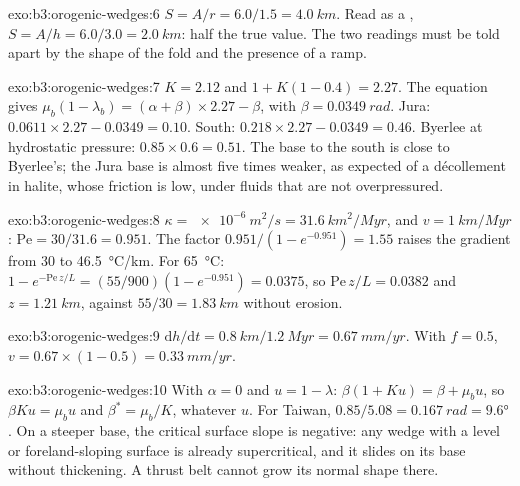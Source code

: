 \begin{solution}{exo:b3:orogenic-wedges:6}
$S = A/r = 6.0/1.5 = \qty{4.0}{km}$. Read as a , $S = A/h =
6.0/3.0 = \qty{2.0}{km}$: half the true value. The two readings must be told
apart by the shape of the fold and the presence of a ramp.
\end{solution}

\begin{solution}{exo:b3:orogenic-wedges:7}
$K = 2.12$ and $1 + K(1 - 0.4) = 2.27$. The equation gives $\mu_b(1 -
\lambda_b) = (\alpha + \beta)\times2.27 - \beta$, with $\beta =
\qty{0.0349}{rad}$. Jura: $0.0611\times2.27 - 0.0349 = 0.10$. South:
$0.218\times2.27 - 0.0349 = 0.46$. Byerlee at hydrostatic pressure:
$0.85\times0.6 = 0.51$. The base to the south is close to Byerlee's; the
Jura base is almost five times weaker, as expected of a décollement in
halite, whose friction is low, under fluids that are not overpressured.
\end{solution}

\begin{solution}{exo:b3:orogenic-wedges:8}
$\kappa = \qty{e-6}{m^2/s} = \qty{31.6}{km^2/Myr}$, and $v =
\qty{1}{km/Myr}$: $\mathrm{Pe} = 30/31.6 = 0.951$. The factor $0.951/(1 -
e^{-0.951}) = 1.55$ raises the gradient from 30 to \qty{46.5}{\celsius/km}.
For \qty{65}{\celsius}: $1 - e^{-\mathrm{Pe}\,z/L} = (55/900)(1 - e^{-0.951})
= 0.0375$, so $\mathrm{Pe}\,z/L = 0.0382$ and $z = \qty{1.21}{km}$, against
$55/30 = \qty{1.83}{km}$ without erosion.
\end{solution}

\begin{solution}{exo:b3:orogenic-wedges:9}
$\mathrm dh/\mathrm dt = \qty{0.8}{km}/\qty{1.2}{Myr} = \qty{0.67}{mm/yr}$.
With $f = 0.5$, $v = 0.67\times(1 - 0.5) = \qty{0.33}{mm/yr}$.
\end{solution}

\begin{solution}{exo:b3:orogenic-wedges:10}
With $\alpha = 0$ and $u = 1 - \lambda$: $\beta(1 + Ku) = \beta + \mu_b u$,
so $\beta Ku = \mu_b u$ and $\beta^* = \mu_b/K$, whatever $u$. For Taiwan,
$0.85/5.08 = \qty{0.167}{rad} = \ang{9.6}$. On a steeper base, the critical
surface slope is negative: any wedge with a level or foreland-sloping surface
is already supercritical, and it slides on its base without thickening. A
thrust belt cannot grow its normal shape there.
\end{solution}

